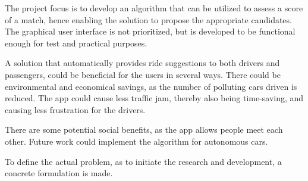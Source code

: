 The project focus is to develop an algorithm that can be utilized to assess a score of a match, hence enabling the solution to propose the appropriate candidates. The graphical user interface is not prioritized, but is developed to be functional enough for test and practical purposes.

A solution that automatically provides ride suggestions to both drivers and passengers, could be beneficial for the users in several ways. There could be environmental and economical savings, as the number of polluting cars driven is reduced. The app could cause less traffic jam, thereby also being time-saving, and causing less frustration for the drivers.

There are some potential social benefits, as the app allows people meet each other. Future work could implement the algorithm for autonomous cars.

\iffalse
Since employers usually are located in the same area, and commuters could live in the same area, there should be a possibility for the commuters  potentially share cars and thereby reduce traffic.
There are many apps\todo{source and define 'app'} that allow users to request and give rides\todo{define}, but they require active participation of the users to do so. 
\fi



To define the actual problem, as to initiate the research and development, a concrete formulation is made.